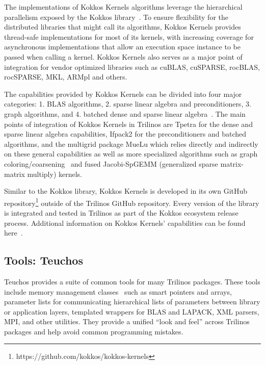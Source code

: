 The implementations of Kokkos Kernels algorithms leverage the hierarchical parallelism exposed by the Kokkos library~\cite{kim2017designing}. To ensure flexibility for the distributed libraries that might call its algorithms, Kokkos Kernels provides thread-safe implementations for most of its kernels, with increasing coverage for asynchronous implementations that allow an execution space instance to be passed when calling a kernel. Kokkos Kernels also serves as a major point of integration for vendor optimized libraries such as cuBLAS, cuSPARSE, rocBLAS, rocSPARSE, MKL, ARMpl and others.

The capabilities provided by Kokkos Kernels can be divided into four major categories:
1. BLAS algorithms, 2. sparse linear algebra and preconditioners, 3. graph algorithms, and
4. batched dense and sparse linear algebra~\cite{liegeois2023performance}. The main
points of integration of Kokkos Kernels in Trilinos are Tpetra for the dense and sparse
linear algebra capabilities, Ifpack2 for the preconditioners and batched algorithms,
and the multigrid package MueLu which relies directly and indirectly on these general capabilities as well as more specialized algorithms such as graph coloring/coarsening~\cite{kelley2022parallel} and fused Jacobi-SpGEMM (generalized sparse matrix-matrix multiply) kernels.

Similar to the Kokkos library, Kokkos Kernels is developed in its own GitHub
repository\footnote{https://github.com/kokkos/kokkos-kernels} outside of the Trilinos
GitHub repository. Every version of the library is integrated and tested in Trilinos
as part of the Kokkos ecosystem release process. Additional information on Kokkos
Kernels' capabilities can be found here~\cite{deveci2018multithreaded,wolf2017fast}.



\subsection{Tools: Teuchos}

Teuchos provides a suite of common tools for many Trilinos packages. These tools include memory management classes~\cite{bartlett2010} such as smart pointers and arrays, parameter lists for communicating hierarchical lists of parameters between library or application layers, templated wrappers for BLAS and LAPACK, XML parsers, MPI, and other utilities. They provide a unified ``look and feel'' across Trilinos packages and help avoid common programming mistakes.



